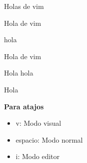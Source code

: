 \documentclass{article}
\begin{document}
 
\begin{center}
  Holas de vim
\end{center}

Hola de vim

hola

\begin{center}
  Hola de vim
\end{center}

Hola hola

Hola

\textbf{Para atajos}

\begin{itemize}
  \item v: Modo visual
  \item espacio: Modo normal
  \item i: Modo editor
\end{itemize}
\end{document}
